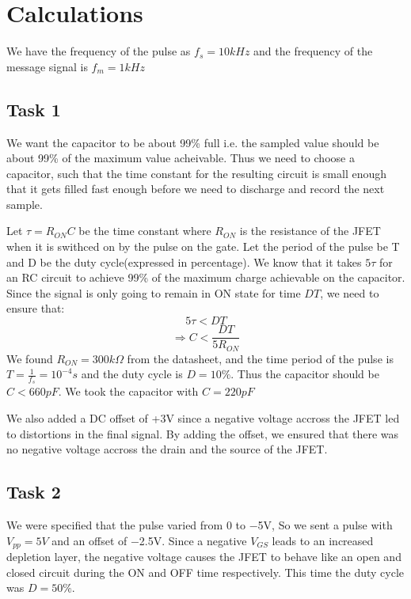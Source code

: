 \documentclass{article}
\newcommand{\ohm}{\Omega}
\begin{document}
\section{Calculations}
We have the frequency of the pulse as $f_s=10kHz$ and the frequency of the message signal is $f_m=1kHz$
\subsection{Task 1}
We want the capacitor to be about 99\% full i.e. the sampled value should be about 99\% of the maximum value acheivable. Thus we need to choose a capacitor, such that the time constant for the resulting circuit is small enough that it gets filled fast enough before we need to discharge and record the next sample. 

Let $\tau = R_{ON} C$ be the time constant where $R_{ON}$ is the resistance of the JFET when it is swithced on by the pulse on the gate. Let the period of the pulse be T and D be the duty cycle(expressed in percentage). We know that it takes $5\tau$ for an RC circuit to achieve 99\% of the maximum charge achievable on the capacitor. Since the signal is only going to remain in ON state for time $DT$, we need to ensure that:
\begin{equation}
    5\tau < DT
\end{equation}
\begin{equation}
  \Rightarrow C<\frac{DT}{5R_{ON}}
\end{equation}
We found $R_{ON}=300k\ohm$ from the datasheet, and the time period of the pulse is $T=\frac{1}{f_s}=10^{-4}s$ and the duty cycle is $D=10\%$. Thus the capacitor should be $C<660pF$.  We took the capacitor with $C=220pF$

We also added a DC offset of +3V since a negative voltage accross the JFET led to distortions in the final signal. By adding the offset, we ensured that there was no negative voltage accross the drain and the source of the JFET.

\subsection{Task 2}
We were specified that the pulse varied from 0 to $-$5V, So we sent a pulse with $V_{pp}=5V$ and an offset of $-$2.5V. Since a negative $V_{GS}$ leads to an increased depletion layer, the negative voltage causes the JFET to behave like an open and closed circuit during the ON and OFF time respectively. This time the duty cycle was $D=50\%$. 
\end{document}
